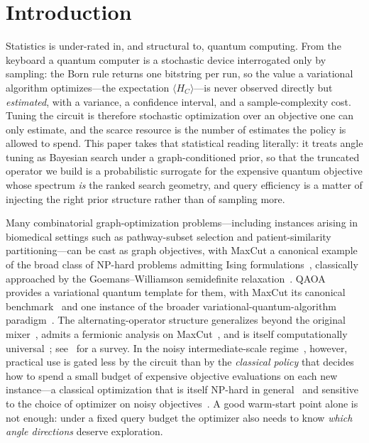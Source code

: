 \documentclass[aps,prxquantum,reprint,amsmath,amssymb,floatfix,nofootinbib,superscriptaddress,longbibliography]{revtex4-2}
\theoremstyle{remark}
\newcommand{\QAOA}{\textnormal{\textsc{QAOA}}}
\begin{document}
\maketitle

\section{Introduction}

Statistics is under-rated in, and structural to, quantum computing.  From the
keyboard a quantum computer is a stochastic device interrogated only by sampling:
the Born rule returns one bitstring per run, so the value a variational algorithm
optimizes---the expectation \(\langle H_C\rangle\)---is never observed directly but
\emph{estimated}, with a variance, a confidence interval, and a sample-complexity
cost.  Tuning the circuit is therefore stochastic optimization over an objective
one can only estimate, and the scarce resource is the number of estimates the
policy is allowed to spend.  This paper takes that statistical reading literally:
it treats angle tuning as Bayesian search under a graph-conditioned prior, so that
the truncated operator we build is a probabilistic surrogate for the expensive
quantum objective whose spectrum \emph{is} the ranked search geometry, and query
efficiency is a matter of injecting the right prior structure rather than of
sampling more.

Many combinatorial graph-optimization problems---including instances arising in
biomedical settings such as pathway-subset selection and patient-similarity
partitioning---can be cast as graph objectives, with MaxCut a canonical example
of the broad class of \(\mathrm{NP}\)-hard problems admitting Ising
formulations~\cite{karp1972,lucas2014}, classically approached by the
Goemans--Williamson semidefinite relaxation~\cite{goemans1995}.  \QAOA{}~\cite{farhi2014,farhi2014bounded}
provides a variational quantum template for them, with MaxCut its canonical
benchmark~\cite{crooks2018,wurtz2021,wurtz2021fixed} and one instance of the broader
variational-quantum-algorithm paradigm~\cite{cerezo2021}.
The alternating-operator structure generalizes beyond the original
mixer~\cite{hadfield2019}, admits a fermionic analysis on MaxCut~\cite{wang2018fermionic},
and is itself computationally universal~\cite{lloyd2018}; see~\cite{blekos2024}
for a survey.  In the noisy
intermediate-scale regime~\cite{preskill2018}, however, practical use is gated
less by the circuit
than by the \emph{classical policy} that decides how to spend a small budget of
expensive objective evaluations on each new instance---a classical optimization
that is itself \(\mathrm{NP}\)-hard in general~\cite{bittel2021} and sensitive to
the choice of optimizer on noisy
objectives~\cite{lavrijsen2020,pellowjarman2021,larkin2022}.  A good warm-start point
alone is not enough: under a fixed query budget the optimizer also needs to know
\emph{which angle directions} deserve exploration.
\end{document}
